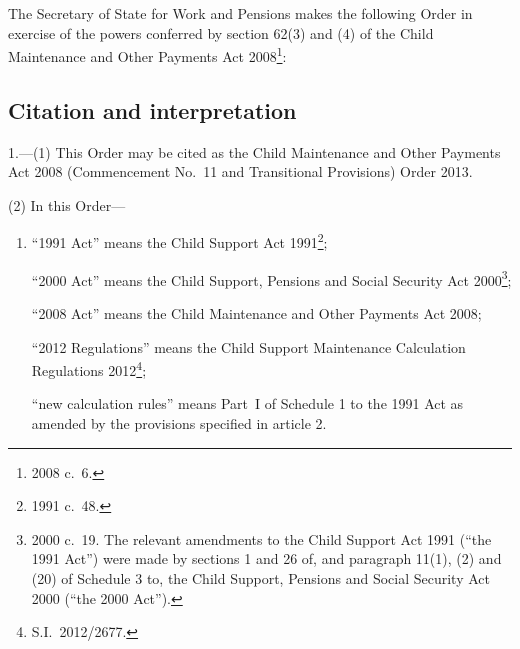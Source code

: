 \documentclass[12pt,a4paper]{article}
\title{\regstitle}
\author{S.I.\ 2013 No.\ 1860 (C.~79)}
\date{Made
23rd July 2013
}
\begin{document}
\maketitle

\enlargethispage{\baselineskip}

\noindent
The Secretary of State for Work and Pensions makes the following Order in exercise of the powers conferred by section 62(3) and (4) of the Child Maintenance and Other Payments Act 2008\footnote{2008 c.~6.}: 

{\sloppy

\tableofcontents

}

\bigskip

\setcounter{secnumdepth}{-2}

\subsection[1. Citation and interpretation]{Citation and interpretation}

1.---(1)  This Order may be cited as the Child Maintenance and Other Payments Act 2008 (Commencement No.~11 and Transitional Provisions) Order 2013.

(2) In this Order—
\begin{enumerate}\item[]
“1991 Act” means the Child Support Act 1991\footnote{1991 c.~48.};

“2000 Act” means the Child Support, Pensions and Social Security Act 2000\footnote{2000 c.~19. The relevant amendments to the Child Support Act 1991 (“the 1991 Act”) were made by sections 1 and 26 of, and paragraph 11(1), (2) and (20) of Schedule 3 to, the Child Support, Pensions and Social Security Act 2000 (“the 2000 Act”).};

“2008 Act” means the Child Maintenance and Other Payments Act 2008;

“2012 Regulations” means the Child Support Maintenance Calculation Regulations 2012\footnote{S.I.~2012/2677.};

“new calculation rules” means Part~I of Schedule 1 to the 1991 Act as amended by the provisions specified in article 2.
\end{enumerate}
\end{document}
